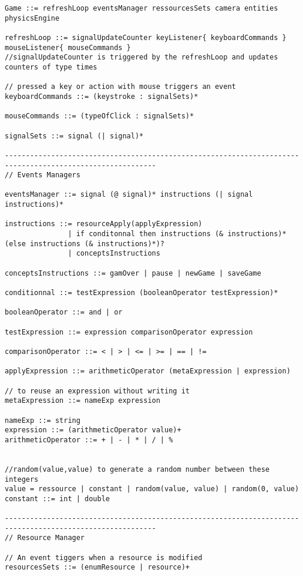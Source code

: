 \begin{lstlisting}[language=Grammar]
 Game ::= refreshLoop eventsManager ressourcesSets camera entities physicsEngine

refreshLoop ::= signalUpdateCounter keyListener{ keyboardCommands } mouseListener{ mouseCommands }
//signalUpdateCounter is triggered by the refreshLoop and updates counters of type times

// pressed a key or action with mouse triggers an event
keyboardCommands ::= (keystroke : signalSets)*

mouseCommands ::= (typeOfClick : signalSets)*

signalSets ::= signal (| signal)*

----------------------------------------------------------------------------------------------------------
// Events Managers

eventsManager ::= signal (@ signal)* instructions (| signal instructions)*

instructions ::= resourceApply(applyExpression) 
               | if conditonnal then instructions (& instructions)* (else instructions (& instructions)*)? 
               | conceptsInstructions

conceptsInstructions ::= gamOver | pause | newGame | saveGame

conditionnal ::= testExpression (booleanOperator testExpression)*

booleanOperator ::= and | or

testExpression ::= expression comparisonOperator expression

comparisonOperator ::= < | > | <= | >= | == | !=

applyExpression ::= arithmeticOperator (metaExpression | expression)

// to reuse an expression without writing it
metaExpression ::= nameExp expression

nameExp ::= string
expression ::= (arithmeticOperator value)+
arithmeticOperator ::= + | - | * | / | %


//random(value,value) to generate a random number between these integers
value = ressource | constant | random(value, value) | random(0, value)
constant ::= int | double

----------------------------------------------------------------------------------------------------------
// Resource Manager

// An event tiggers when a resource is modified
resourcesSets ::= (enumResource | resource)+



\end{lstlisting}
